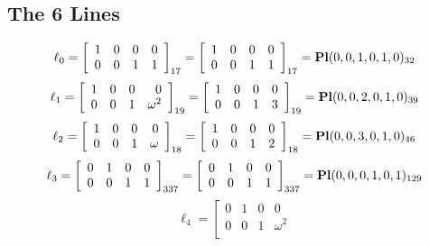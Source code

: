 \documentclass{article}
\begin{document}
{\subsection*{The 6 Lines}
$$
\ell_{0} = 
\left[
\begin{array}{*{4}{r}}
1 & 0 & 0 & 0\\
0 & 0 & 1 & 1\\
\end{array}
\right]
_{17}
=
\left[
\begin{array}{*{4}c}
1  & 0  & 0  & 0\\
0  & 0  & 1  & 1\\
\end{array}
\right]_{17}
={\rm\bf Pl}(0,0,1,0,1,0 )_{32}$$
$$
\ell_{1} = 
\left[
\begin{array}{*{4}{r}}
1 & 0 & 0 & 0\\
0 & 0 & 1 & \omega^{2}\\
\end{array}
\right]
_{19}
=
\left[
\begin{array}{*{4}c}
1  & 0  & 0  & 0\\
0  & 0  & 1  & 3\\
\end{array}
\right]_{19}
={\rm\bf Pl}(0,0,2,0,1,0 )_{39}$$
$$
\ell_{2} = 
\left[
\begin{array}{*{4}{r}}
1 & 0 & 0 & 0\\
0 & 0 & 1 & \omega \\
\end{array}
\right]
_{18}
=
\left[
\begin{array}{*{4}c}
1  & 0  & 0  & 0\\
0  & 0  & 1  & 2\\
\end{array}
\right]_{18}
={\rm\bf Pl}(0,0,3,0,1,0 )_{46}$$
$$
\ell_{3} = 
\left[
\begin{array}{*{4}{r}}
0 & 1 & 0 & 0\\
0 & 0 & 1 & 1\\
\end{array}
\right]
_{337}
=
\left[
\begin{array}{*{4}c}
0  & 1  & 0  & 0\\
0  & 0  & 1  & 1\\
\end{array}
\right]_{337}
={\rm\bf Pl}(0,0,0,1,0,1 )_{129}$$
$$
\ell_{4} = 
\left[
\begin{array}{*{4}{r}}
0 & 1 & 0 & 0\\
0 & 0 & 1 & \omega^{2}\\

\end{array}$$}
\end{document}
